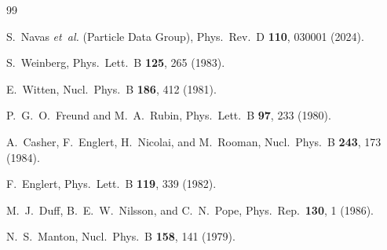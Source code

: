 \documentclass[aps,prl,twocolumn,superscriptaddress,floatfix,nofootinbib,reprint]{revtex4-2}
\newcommand{\sinsq}{\sin^{2}\!\theta_{W}}
\begin{document}


\begin{thebibliography}{99}

S.~Navas \emph{et~al.} (Particle Data Group), Phys.\ Rev.\ D \textbf{110},
030001 (2024).

S.~Weinberg, Phys.\ Lett.\ B \textbf{125}, 265 (1983).

E.~Witten, Nucl.\ Phys.\ B \textbf{186}, 412 (1981).

P.~G.~O.~Freund and M.~A.~Rubin, Phys.\ Lett.\ B \textbf{97}, 233 (1980).

A.~Casher, F.~Englert, H.~Nicolai, and M.~Rooman, Nucl.\ Phys.\ B
\textbf{243}, 173 (1984).

F.~Englert, Phys.\ Lett.\ B \textbf{119}, 339 (1982).

M.~J.~Duff, B.~E.~W.~Nilsson, and C.~N.~Pope, Phys.\ Rep.\ \textbf{130},
1 (1986).

N.~S.~Manton, Nucl.\ Phys.\ B \textbf{158}, 141 (1979).


\end{thebibliography}
\end{document}
